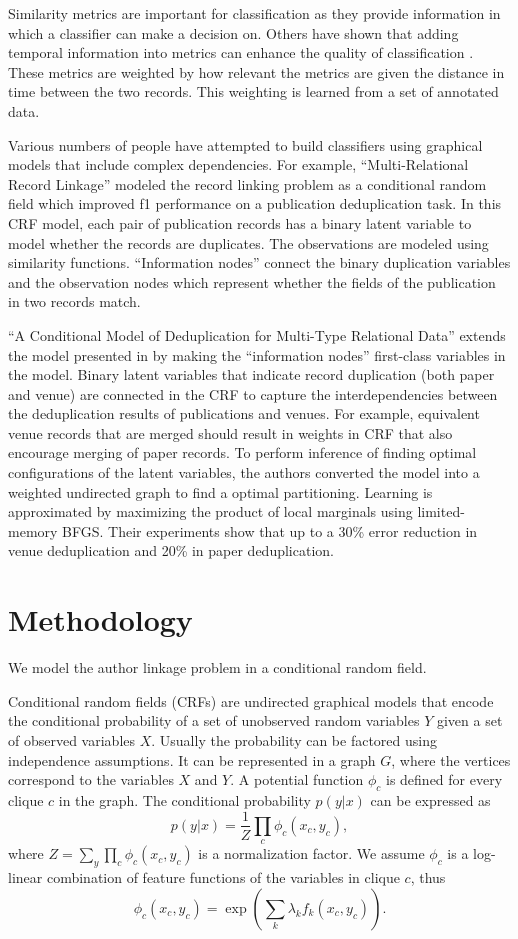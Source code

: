 \documentclass[twocolumn,letterpaper]{article}
\begin{document}
Similarity metrics are important for classification as they provide information in which a classifier can make a decision on. Others have shown that adding temporal information into metrics can enhance the quality of classification \cite{DBLP:journals/fcsc/LiDMS12}. These metrics are weighted by how relevant the metrics are given the distance in time between the two records. This weighting is learned from a set of annotated data.

Various numbers of people have attempted to build classifiers using graphical models that include complex dependencies. For example, ``Multi-Relational Record Linkage'' \cite{Domingos04multi} modeled the record linking problem as a conditional random field which improved f1 performance on a publication deduplication task. In this CRF model, each pair of publication records has a binary latent variable to model whether the records are duplicates.  The observations are modeled using similarity functions.  ``Information nodes'' connect the binary duplication variables and the observation nodes which represent whether the fields of the publication in two records match.

``A Conditional Model of Deduplication for Multi-Type Relational Data'' \cite{Culotta05aconditional} extends the model presented in \cite{Domingos04multi} by making the ``information nodes'' first-class variables in the model.  Binary latent variables that indicate record duplication (both paper and venue) are connected in the CRF to capture the interdependencies between the deduplication results of publications and venues.  For example, equivalent venue records that are merged should result in weights in CRF that also encourage merging of paper records.  To perform inference of finding optimal configurations of the latent variables, the authors converted the model into a weighted undirected graph to find a optimal partitioning.  Learning is approximated by maximizing the product of local marginals using limited-memory BFGS.  Their experiments show that up to a 30\% error reduction in venue deduplication and 20\% in paper deduplication. 

\section{Methodology} %
\label{sec:methodology}
We model the author linkage problem in a conditional random field.

Conditional random fields (CRFs) are undirected graphical models that encode the conditional probability of a set of unobserved random variables $Y$ given a set of observed variables $X$.  Usually the probability can be factored using independence assumptions.  It can be represented in a graph $G$, where the vertices correspond to the variables $X$ and $Y$.  A potential function $\phi_c$ is defined for every clique $c$ in the graph.  The conditional probability $p(y|x)$ can be expressed as
$$p(y|x)=\frac{1}{Z}\prod_c \phi_c(x_c,y_c),$$
where $Z=\sum_y\prod_c \phi_c(x_c,y_c)$ is a normalization factor.  We assume $\phi_c$ is a log-linear combination of feature functions of the variables in clique $c$, thus
$$\phi_c(x_c,y_c)=\exp\left(\sum_k \lambda_k f_k(x_c,y_c)\right).$$
\end{document}
